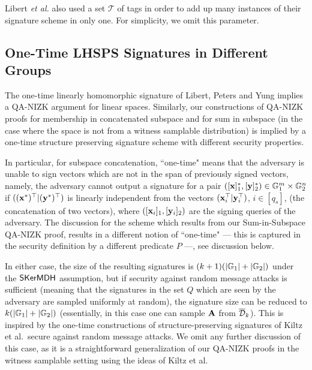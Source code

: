 Libert \textit{et al.} also used a set $\mathcal{T}$ of tags in order to add up many instances of their signature scheme
in only one. For simplicity, we omit this parameter.


\subsection{One-Time LHSPS Signatures in Different Groups} \label{sec:newhomtwogroups}

The one-time linearly homomorphic signature of Libert, Peters and Yung \cite{EC:LPJY14}  implies a QA-NIZK argument for linear spaces. Similarly, our constructions of QA-NIZK proofs for membership in concatenated subspace and for sum in subspace (in the case where the space is not from a witness samplable distribution) is implied by a one-time structure preserving signature scheme with different security properties. 

In particular, for subspace concatenation, ``one-time" means that the adversary is unable to sign vectors which are not in the span of previously signed vectors, namely,
the adversary cannot output a signature for a pair
$([\mathbf{x}]_1^*,[\mathbf{y}]_2^*) \in \mathbb{G}_1^{m} \times \mathbb{G}_2^{n}$ if $((\mathbf{x}^*)^{\top}|(\mathbf{y}^*)^{\top})$ is
linearly independent from the 
vectors $(\mathbf{x}_i^{\top}|\mathbf{y}_i^{\top})$, $i \in [q_s]$, (the concatenation of two vectors), where $([\mathbf{x}_i]_1,[\mathbf{y}_i]_2)$ are the signing queries of the adversary. The discussion for the scheme which results from our 
Sum-in-Subspace QA-NIZK proof, results in a different notion of ``one-time" --- this is captured in the security definition by a different predicate $P$ ---, see discussion below. 

In either case, the size of the resulting signatures is $(k+1)(|\mathbb{G}_1|+|\mathbb{G}_2|)$ under the $\mathsf{SKerMDH}$ assumption, but if security against random message attacks is sufficient (meaning that the signatures in the set $Q$ which are seen by the adversary are sampled uniformly at random), the signature size can be reduced to $k(|\mathbb{G}_1|+|\mathbb{G}_2|)$ (essentially, in this case one can sample $\mathbf{{A}}$ from $\overline{\mathcal{D}}_k$). This is inspired by the one-time constructions of structure-preserving signatures of Kiltz et al.~secure against random message attacks\cite{C:KilPanWee15}. 
 We omit any further discussion of this case, as it is a straightforward generalization of our QA-NIZK proofs in the witness samplable setting using the ideas of Kiltz et al. 




